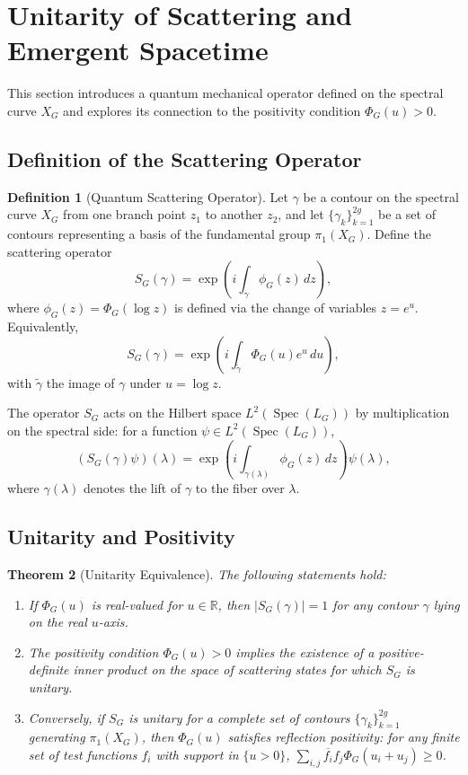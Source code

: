 \documentclass[12pt]{article}
\newtheorem{theorem}{Theorem}[section]
\theoremstyle{definition}
\newtheorem{definition}[theorem]{Definition}
\DeclareMathOperator{\Spec}{Spec}
\newcommand{\R}{\mathbb{R}}
\begin{document}
\section{Unitarity of Scattering and Emergent Spacetime}
This section introduces a quantum mechanical operator defined on the spectral curve $X_G$ and explores its connection to the positivity condition $\Phi_G(u) > 0$.

\subsection{Definition of the Scattering Operator}
\begin{definition}[Quantum Scattering Operator]
Let $\gamma$ be a contour on the spectral curve $X_G$ from one branch point $z_1$ to another $z_2$, and let $\{\gamma_k\}_{k=1}^{2g}$ be a set of contours representing a basis of the fundamental group $\pi_1(X_G)$. Define the scattering operator
\[
S_G(\gamma) = \exp\left(i \int_\gamma \phi_G(z) \, dz\right),
\]
where $\phi_G(z) = \Phi_G(\log z)$ is defined via the change of variables $z = e^u$. Equivalently,
\[
S_G(\gamma) = \exp\left(i \int_{\tilde{\gamma}} \Phi_G(u) e^u \, du\right),
\]
with $\tilde{\gamma}$ the image of $\gamma$ under $u = \log z$.

The operator $S_G$ acts on the Hilbert space $L^2(\Spec(L_G))$ by multiplication on the spectral side: for a function $\psi \in L^2(\Spec(L_G))$,
\[
(S_G(\gamma)\psi)(\lambda) = \exp\left(i \int_{\gamma(\lambda)} \phi_G(z) \, dz\right) \psi(\lambda),
\]
where $\gamma(\lambda)$ denotes the lift of $\gamma$ to the fiber over $\lambda$.
\end{definition}

\subsection{Unitarity and Positivity}
\begin{theorem}[Unitarity Equivalence]\label{thm:unitarity}
The following statements hold:
\begin{enumerate}
 \item If $\Phi_G(u)$ is real-valued for $u \in \R$, then $|S_G(\gamma)| = 1$ for any contour $\gamma$ lying on the real $u$-axis.
 \item The positivity condition $\Phi_G(u) > 0$ implies the existence of a positive-definite inner product on the space of scattering states for which $S_G$ is unitary.
 \item Conversely, if $S_G$ is unitary for a complete set of contours $\{\gamma_k\}_{k=1}^{2g}$ generating $\pi_1(X_G)$, then $\Phi_G(u)$ satisfies reflection positivity: for any finite set of test functions $f_i$ with support in $\{u > 0\}$, $\sum_{i,j} \overline{f_i} f_j \Phi_G(u_i + u_j) \ge 0$.
\end{enumerate}
\end{theorem}
\end{document}

